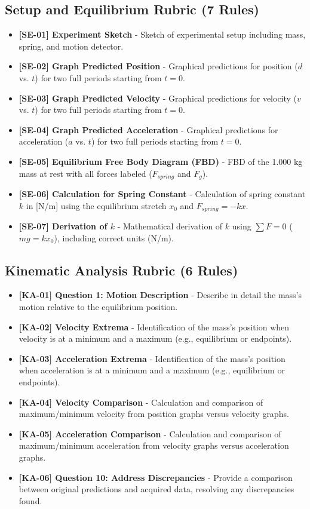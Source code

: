 \documentclass{article}
\begin{document}
\subsection*{Setup and Equilibrium Rubric (7 Rules)}
\begin{itemize}
\item \textbf{ [SE-01] Experiment Sketch } - Sketch of experimental setup including mass, spring, and motion detector.
\item \textbf{ [SE-02] Graph Predicted Position } - Graphical predictions for position ($d$ vs. $t$) for two full periods starting from $t=0$.
\item \textbf{ [SE-03] Graph Predicted Velocity } - Graphical predictions for velocity ($v$ vs. $t$) for two full periods starting from $t=0$. 
\item \textbf{ [SE-04] Graph Predicted Acceleration } - Graphical predictions for acceleration ($a$ vs. $t$) for two full periods starting from $t=0$. 
\item \textbf{ [SE-05] Equilibrium Free Body Diagram (FBD) } - FBD of the 1.000 kg mass at rest with all forces labeled ($F_{spring}$ and $F_g$).
\item \textbf{ [SE-06] Calculation for Spring Constant } - Calculation of spring constant $k$ in [N/m] using the equilibrium stretch $x_0$ and $F_{spring} = -kx$.
\item \textbf{ [SE-07] Derivation of $k$ } - Mathematical derivation of $k$ using $\sum F = 0$ ($mg = kx_0$), including correct units (N/m).    
\end{itemize}

\subsection*{Kinematic Analysis Rubric (6 Rules)}
\begin{itemize}
\item \textbf{ [KA-01] Question 1: Motion Description } - Describe in detail the mass's motion relative to the equilibrium position.
\item \textbf{ [KA-02] Velocity Extrema } - Identification of the mass's position when velocity is at a minimum and a maximum (e.g., equilibrium or endpoints).
\item \textbf{ [KA-03] Acceleration Extrema } - Identification of the mass's position when acceleration is at a minimum and a maximum (e.g., equilibrium or endpoints).
\item \textbf{ [KA-04] Velocity Comparison } - Calculation and comparison of maximum/minimum velocity from position graphs versus velocity graphs.
\item \textbf{ [KA-05] Acceleration Comparison } - Calculation and comparison of maximum/minimum acceleration from velocity graphs versus acceleration graphs.
\item \textbf{ [KA-06] Question 10: Address Discrepancies } - Provide a comparison between original predictions and acquired data, resolving any discrepancies found.
\end{itemize}
\end{document}
